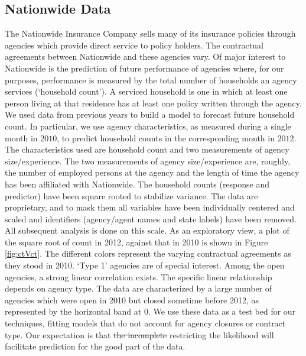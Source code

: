\documentclass[11pt]{article}
\newcommand{\green}[1]{{\color{green}#1}}
\begin{document}

\subsection{Nationwide Data}
The Nationwide Insurance Company sells many of its insurance policies through agencies which provide direct service to policy holders.  
The contractual agreements between Nationwide and these agencies vary.  Of major interest to Nationwide is the prediction of future performance of agencies where, for our purposes,  performance is measured by the total number of households an agency services (`household count'). A serviced household is one in which at least one person living at that residence has at least one policy written through the agency. We used data from previous years to build a model to forecast future household count. In particular, we use agency characteristics, as measured during a single month in $2010$, to predict household counts in the corresponding month in $2012$. The characteristics used are household count and two measurements of agency size/experience. The two measurements of agency size/experience are, roughly, the number of employed persons at the agency and the length of time the agency has been affiliated with Nationwide. The household counts (response and predictor) have been square rooted to stabilize variance. The data are 
proprietary, and to mask them all variables have been individually centered and scaled and identifiers (agency/agent names and state
labels) have been removed. 
All subsequent analysis is done on this scale.  As an exploratory view, a plot of the square root of count in 2012, against that in 2010 
is shown in Figure \ref{fig:ctVct}.  The different colors represent the varying contractual agreements as they stood in 2010. `Type 1' agencies are of special interest.  Among the open agencies, a strong linear correlation exists.  The specific linear relationship
depends on agency type. The data are characterized by a large number of agencies which were open in 2010 but closed sometime before 2012, as represented by the horizontal band at $0$. We use these data as a test bed for our techniques, fitting models that do not account for agency closures or contract type.  Our expectation is that \green{\sout{the incomplete} restricting the} likelihood will facilitate prediction for the good part of the data.  

\end{document}
